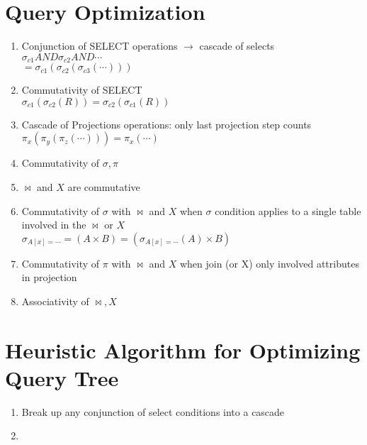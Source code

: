 \documentclass[12pt]{article}
\begin{document}
	\section*{Query Optimization}
		\begin{enumerate}
			\item
				Conjunction of SELECT operations $\rightarrow$ cascade of selects \\
				$\sigma_{c1} AND \sigma_{c2} AND \cdots$ \\
				$=\sigma_{c1}(\sigma_{c2}(\sigma_{c3}(\cdots)))$
			\item
				Commutativity of SELECT \\
				$\sigma_{c1}(\sigma_{c2}(R)) = \sigma_{c2}(\sigma_{c1}(R))$
			\item
				Cascade of Projections operations: only last projection step counts \\
				$\pi_{x}(\pi_{y}(\pi_{z}(\cdots))) = \pi_{x}(\cdots)$
			\item
				Commutativity of $\sigma, \pi$
			\item
				$\bowtie$ and $X$ are commutative
			\item
				Commutativity of $\sigma$ with $\bowtie$ and $X$ when $\sigma$ condition applies to a single table involved in the $\bowtie$ or $X$ \\
				$\sigma_{A[x]=\cdots} = (A \times B) = (\sigma_{A[x]=\cdots}(A) \times B)$
			\item
				Commutativity of $\pi$ with $\bowtie$ and $X$ when join (or X) only involved attributes in projection
			\item
				Associativity of $\bowtie, X$
		\end{enumerate}
	\section*{Heuristic Algorithm for Optimizing Query Tree}
		\begin{enumerate}
			\item
				Break up any conjunction of select conditions into a cascade
			\item

		\end{enumerate}
\end{document}
